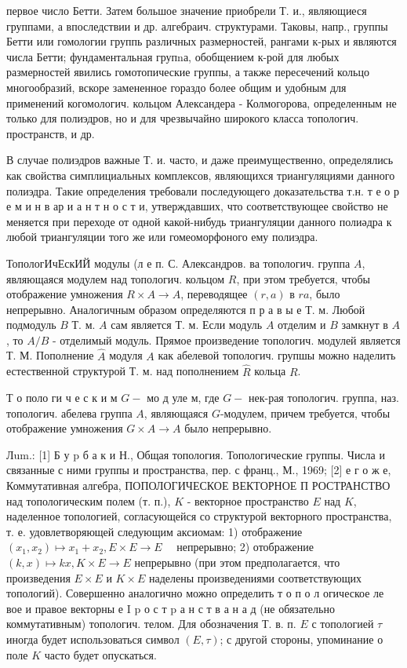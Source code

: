 \documentclass[10pt]{article}
\begin{document}
первое число Бетти. Затем большое значение приобрели Т. и., являющиеся группами, а впоследствии и др. алгебраич. структурами. Таковы, напр., группы Бетти или гомологии группь различных размерностей, рангами к-рых и являются числа Бетти; фундаментальная групnа, обобщением к-рой для любых размерностей явились гомотопические группы, а также пересечений кольцо многообразий, вскоре замененное гораздо более общим и удобным для применений когомологич. кольцом Александера - Колмогорова, определенным не только для полиэдров, но и для чрезвычайно широкого класса топологич. пространств, и др.



В случае полиэдров важные Т. и. часто, и даже преимущественно, определялись как свойства симплициальных комплексов, являющихся триангуляциями данного полиэдра. Такие определения требовали последующего доказательства т.н. т е о р е м и н в ар и а н т н о с т и, утверждавших, что соответствующее свойство не меняется при переходе от одной какой-нибудь триангуляции данного полиәдра к любой триангуляции того же или гомеоморфоного ему полиэдра.



ТопологИчЕскИЙ модулы (л е п. С. Александров. ва топологич. группа $A$, являющаяся модулем над топологич. кольцом $R$, при этом требуется, чтобы отображение умножения $R \times A \rightarrow A$, переводящее $(r, a)$ в $r a$, было непрерывно. Аналогичным образом определяются п р а в ы е Т. м. Любой подмодуль $B$ Т. м. $A$ сам является Т. м. Если модуль $A$ отделим и $B$ замкнут в $A$, то $A / B$ - отделимый модуль. Прямое произведение топологич. модулей является Т. М. Пополнение $\widehat{A}$ модуля $A$ как абелевой топологич. групшы можно наделить естественной структурой Т. м. над пополнением $\hat{R}$ кольца $R$.



Т о поло ги ч е с к и м $G-$ мо д уле м, где $G-$ нек-рая топологич. группа, наз. топологич. абелева группа $A$, являющаяся $G$-модулем, причем требуется, чтобы отображение умножения $G \times A \rightarrow A$ было непрерывно.



Лum.: [1] Б у p б а к и Н., Общая топология. Топологические группы. Числа и связанные с ними группы и пространства, пер. с франц., М., 1969; [2] е г о ж е, Коммутативная алгебра, ПОПОЛОГИЧЕСКОЕ ВЕКТОРНОЕ П РОСТРАНСТВО над топологическим полем (т. п.), $K$ - векторное пространство $E$ над $K$, наделенное топологией, согласующейся со структурой векторного пространства, т. е. удовлетворяющей следующим аксиомам: 1) отображение $\left(x_{1}, x_{2}\right) \mapsto x_{1}+x_{2}, E \times E \rightarrow E \quad$ непрерывно; 2) отображение $(k, x) \mapsto k x, K \times E \rightarrow E$ непрерывно (при этом предполагается, что произведения $E \times E$ и $K \times E$ наделены произведениями соответствующих топологий). Совершенно аналогично можно определить т о п о л огическое ле вое и правое векторны е I $\mathrm{p}$ о с т $\mathrm{p}$ а н с т в а н а д (не обязательно коммутативным) топологич. телом. Для обозначения Т. в. п. $E$ с топологией $\tau$ иногда будет использоваться символ $(E, \tau)$; с другой стороны, упоминание о поле $K$ часто будет опускаться.
\end{document}
